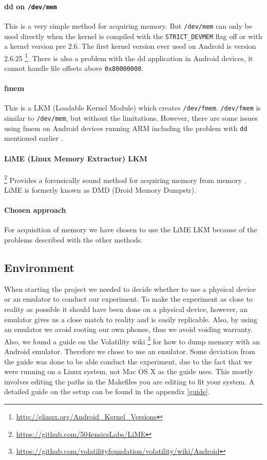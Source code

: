 \paragraph{dd on \texttt{/dev/mem}} This is a very simple method for acquiring memory. But \texttt{/dev/mem} 
can only be used directly when the kernel is compiled with the \texttt{STRICT\_DEVMEM} flag off or with 
a kernel version pre 2.6. The first kernel version ever used on Android is version 2.6.25
\footnote{\url{http://elinux.org/Android\_Kernel\_Versions}}. There is also a problem with the dd 
application in Android devices, it cannot handle file offsets above \texttt{0x80000000}\cite{acq_vol_android_mem}.
\paragraph{fmem} This is a LKM (Loadable Kernel Module) which creates \texttt{/dev/fmem}. \texttt{/dev/fmem} 
is similar to \texttt{/dev/mem}, but without the limitations. However, there are some issues using 
fmem on Android devices running ARM including the problem with \texttt{dd} mentioned earlier \cite{acq_vol_android_mem}.
\paragraph{LiME (Linux Memory Extractor) LKM}\footnote{\url{https://github.com/504ensicsLabs/LiME}}
Provides a forensically sound method for acquiring memory from memory \cite{heriyanto2013procedures}. 
LiME is formerly known as DMD (Droid Memory Dumpstr).
\paragraph{Chosen approach} For acquisition of memory we have chosen to use the LiME LKM because of 
the problems described with the other methods.
\subsection{Environment}
When starting the project we needed to decide whether to use a physical device 
or an emulator to conduct our experiment. To make the experiment as close to 
reality as possible it should have been done on a physical device, however, an 
emulator gives us a close match to reality and is easily replicable. Also, by 
using an emulator we avoid rooting our own phones, thus we avoid voiding 
warranty. Also, we found a guide on the Volatility wiki
\footnote{\url{https://github.com/volatilityfoundation/volatility/wiki/Android}} 
for how to dump memory with an Android emulator. Therefore we chose to use an 
emulator. Some deviation from the guide was done to be able conduct the 
experiment, due to the fact that we were running on a Linux system, not Mac OS 
X as the guide uses. This mostly involves editing the paths in the Makefiles 
you are editing to fit your system. %
A detailed guide on the setup can be found in the appendix \ref{guide}.\\

